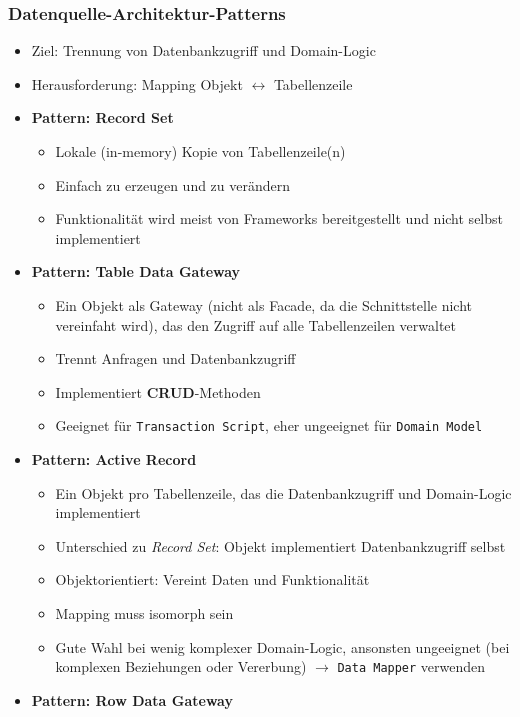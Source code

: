 \subsubsection{Datenquelle-Architektur-Patterns}
\begin{itemize}
	\item Ziel: Trennung von Datenbankzugriff und Domain-Logic
	\item Herausforderung: Mapping Objekt \(\leftrightarrow\) Tabellenzeile
	\item \textbf{Pattern: Record Set}
	\begin{itemize}
		\item Lokale (in-memory) Kopie von Tabellenzeile(n)
		\item Einfach zu erzeugen und zu verändern
		\item Funktionalität wird meist von Frameworks bereitgestellt und nicht selbst implementiert
	\end{itemize}
	\item \textbf{Pattern: Table Data Gateway}
	\begin{itemize}
		\item Ein Objekt als Gateway (nicht als Facade, da die Schnittstelle nicht vereinfaht wird), das den Zugriff auf alle Tabellenzeilen verwaltet
		\item Trennt Anfragen und Datenbankzugriff
		\item Implementiert \textbf{CRUD}-Methoden
		\item Geeignet für \texttt{Transaction Script}, eher ungeeignet für \texttt{Domain Model}
	\end{itemize}
	\item \textbf{Pattern: Active Record}
	\begin{itemize}
		\item Ein Objekt pro Tabellenzeile, das die Datenbankzugriff und Domain-Logic implementiert
		\item Unterschied zu \textit{Record Set}: Objekt implementiert Datenbankzugriff selbst %
		\item Objektorientiert: Vereint Daten und Funktionalität
		\item Mapping muss isomorph sein
		\item Gute Wahl bei wenig komplexer Domain-Logic, ansonsten ungeeignet (bei komplexen Beziehungen oder Vererbung) \(\rightarrow\) \texttt{Data Mapper} verwenden
	\end{itemize}
	\item \textbf{Pattern: Row Data Gateway}
	\begin{itemize}

\end{itemize}
\end{itemize}
